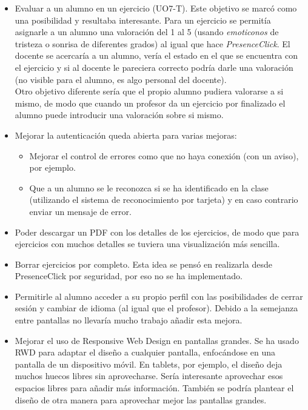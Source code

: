 \begin{itemize}
\item Evaluar a un alumno en un ejercicio (UO7-T). Este objetivo se marcó como una posibilidad y resultaba interesante. Para un ejercicio se permitía asignarle a un alumno una valoración del 1 al 5 (usando \textit{emoticonos} de tristeza o sonrisa de diferentes grados) al igual que hace \textit{PresenceClick}. El docente se acercaría a un alumno, vería el estado en el que se encuentra con el ejercicio y si al docente le pareciera correcto podría darle una valoración (no visible para el alumno, es algo personal del docente).\\

Otro objetivo diferente sería que el propio alumno pudiera valorarse a si mismo, de modo que cuando un profesor da un ejercicio por finalizado el alumno puede introducir una valoración sobre si mismo.\\

\item Mejorar la autenticación queda abierta para varias mejoras:
\begin{itemize}
\item Mejorar el control de errores como que no haya conexión (con un aviso), por ejemplo.
\item Que a un alumno se le reconozca si se ha identificado en la clase (utilizando el sistema de reconocimiento por tarjeta) y en caso contrario enviar un mensaje de error.
\end{itemize}

\item Poder descargar un PDF con los detalles de los ejercicios, de modo que para ejercicios con muchos detalles se tuviera una visualización más sencilla.

\item Borrar ejercicios por completo. Esta idea se pensó en realizarla desde PresenceClick por seguridad, por eso no se ha implementado.

\item Permitirle al alumno acceder a su propio perfil con las posibilidades de cerrar sesión y cambiar de idioma (al igual que el profesor). Debido a la semejanza entre pantallas no llevaría mucho trabajo añadir esta mejora.

\item Mejorar el uso de Responsive Web Design en pantallas grandes. Se ha usado RWD para adaptar el diseño a cualquier pantalla, enfocándose en una pantalla de un dispositivo móvil. En tablets, por ejemplo, el diseño deja muchos huecos libres sin aprovecharse. Sería interesante aprovechar esos espacios libres para añadir más información. También se podría plantear el diseño de otra manera para aprovechar mejor las pantallas grandes. 
\end{itemize}

